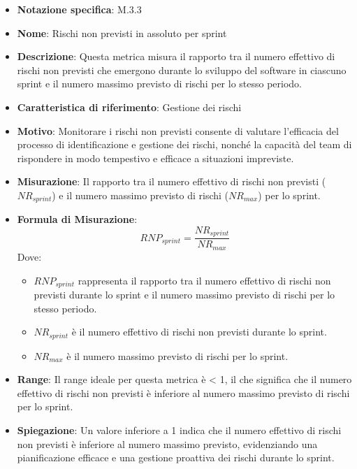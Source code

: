 \begin{itemize}
    \item \textbf{Notazione specifica}: M.3.3
    \item \textbf{Nome}: Rischi non previsti in assoluto per sprint
    \item \textbf{Descrizione}: Questa metrica misura il rapporto tra il numero effettivo di rischi non previsti che emergono durante lo sviluppo del software in ciascuno sprint e il numero massimo previsto di rischi per lo stesso periodo.
    \item \textbf{Caratteristica di riferimento}: Gestione dei rischi
    \item \textbf{Motivo}: Monitorare i rischi non previsti consente di valutare l'efficacia del processo di identificazione e gestione dei rischi, nonché la capacità del team di rispondere in modo tempestivo e efficace a situazioni impreviste.
    \item \textbf{Misurazione}: Il rapporto tra il numero effettivo di rischi non previsti (\(NR_{sprint}\)) e il numero massimo previsto di rischi (\(NR_{max}\)) per lo sprint.
    \item \textbf{Formula di Misurazione}:
    \[
    RNP_{sprint} = \frac{NR_{sprint}}{NR_{max}}
    \]
    Dove:
    \begin{itemize}
        \item \(RNP_{sprint}\) rappresenta il rapporto tra il numero effettivo di rischi non previsti durante lo sprint e il numero massimo previsto di rischi per lo stesso periodo.
        \item \(NR_{sprint}\) è il numero effettivo di rischi non previsti durante lo sprint.
        \item \(NR_{max}\) è il numero massimo previsto di rischi per lo sprint.
    \end{itemize}
    \item \textbf{Range}: Il range ideale per questa metrica è < 1, il che significa che il numero effettivo di rischi non previsti è inferiore al numero massimo previsto di rischi per lo sprint.
    \item \textbf{Spiegazione}: Un valore inferiore a 1 indica che il numero effettivo di rischi non previsti è inferiore al numero massimo previsto, evidenziando una pianificazione efficace e una gestione proattiva dei rischi durante lo sprint.
\end{itemize}
